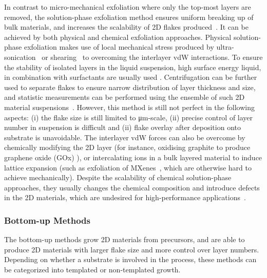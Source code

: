 In contrast to micro-mechanical exfoliation where only the top-most
layers are removed, the solution-phase exfoliation method ensures
uniform breaking up of bulk materials, and increases the scalability
of 2D flakes produced~\cite{Coleman_2012_rev}.
It can be achieved by
both physical and chemical exfoliation approaches.
%
Physical solution-phase exfoliation makes use of local mechanical
stress produced by ultra-sonication~\smartcite{Xia_2013_liquidphase}
or shearing~\cite{Paton_2014_shearing} to overcoming the interlayer
vdW interactions. To ensure the stability of isolated layers in the
liquid suspension, high surface energy liquid, in combination with
surfactants are usually used
\cite{Coleman_2012_rev,Paton_2014_shearing,Hanlon_2015_shear,Backes_2014_mos2,Shih_2010_exf,Shih_2011_bitri}.
%
Centrifugation can be further used to separate flakes to ensure narrow
distribution of layer thickness and size, and statistic measurements
can be performed using the ensemble of such 2D material
suspensions~\cite{Backes_2014_mos2}.
%
However, this method is still not perfect in the following aspects:
(i) the flake size is still limited to μm-scale, (ii) precise control
of layer number in suspension is difficult and (ii) flake overlay
after deposition onto substrate is unavoidable.
%
The interlayer vdW forces can also be overcome by chemically modifying
the 2D layer (for instance, oxidising graphite to produce graphene
oxide (GOx) \cite{Chen_2013_GO}), or intercalating ions in a bulk
layered material to induce lattice expansion (such as exfoliation of
MXenes~\cite{Naguib_2011_Mxene}, which are otherwise hard to achieve
mechanically). Despite the scalability of chemical solution-phase
approaches, they usually changes the chemical composition and
introduce defects in the 2D materials, which are undesired for
high-performance applications~\cite{Lin_2019_gr_rev_growth}.

\subsubsection{Bottom-up Methods}
\label{sec:bottom-up-methods}

The bottom-up methods grow 2D materials from precursors, and are able
to produce 2D materials with larger flake size and more control over
layer numbers.
%
Depending on whether a substrate is involved in the
process, these methods can be categorized into templated or
non-templated growth.

